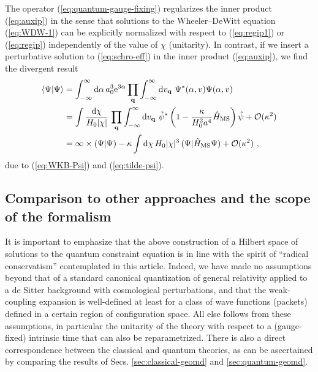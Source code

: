 \documentclass[12pt]{iopart}
\def\eq#1{\begin{equation}\begin{aligned}#1\end{aligned}\end{equation}}
\def\eref#1{(\ref{eq:#1})}
\def\D{\mathrm{d}}
\def\e{\mathrm{e}}
\def\Ob{\mathcal{O}}
\def\q{\mathbf{q}}
\begin{document}
The operator \eref{quantum-gauge-fixing} regularizes the inner product \eref{auxip} in the sense that solutions to the Wheeler--DeWitt equation \eref{WDW-1} can be explicitly normalized with respect to \eref{regip1} or \eref{regip} independently of the value of $\chi$ (unitarity). In contrast, if we insert a perturbative solution to \eref{schro-eff} in the inner product \eref{auxip}, we find the divergent result
\eq{
\braket{\Psi|\Psi} &= \int_{-\infty}^{\infty}\D\alpha\,a_0^3\e^{3\alpha}\prod_{\q}\int_{-\infty}^{\infty}\D v_{\q}\ \Psi^*(\alpha,v)\Psi(\alpha,v)\\
&=\int\frac{\D\chi}{H_0|\chi|}\, \prod_{\q}\int_{-\infty}^{\infty}\D v_{\q}\ \tilde{\psi}^*\left(1-\frac{\kappa}{H_0^2a^4}\hat{H}_{\rm MS}\right)\tilde{\psi}+\Ob(\kappa^2)\\
&=\infty\times(\Psi|\Psi)-\kappa\int\D\chi\, H_0|\chi|^3\, (\Psi|\hat{H}_{\rm MS}\Psi)+\Ob(\kappa^2) \ ,
}
due to \eref{WKB-Psi} and \eref{tilde-psi}.

\subsection{\label{sec:scope}Comparison to other approaches and the scope of the formalism}
It is important to emphasize that the above construction of a Hilbert space of solutions to the quantum constraint equation is in line with the spirit of ``radical conservatism'' contemplated in this article. Indeed, we have made no assumptions beyond that of a standard canonical quantization of general relativity applied to a de Sitter background with cosmological perturbations, and that the weak-coupling expansion is well-defined at least for a class of wave functions (packets) defined in a certain region of configuration space. All else follows from these assumptions, in particular the unitarity of the theory with respect to a (gauge-fixed) intrinsic time that can also be reparametrized. There is also a direct correspondence between the classical and quantum theories, as can be ascertained by comparing the results of Secs. \ref{sec:classical-geomd} and \ref{sec:quantum-geomd}.
\end{document}
